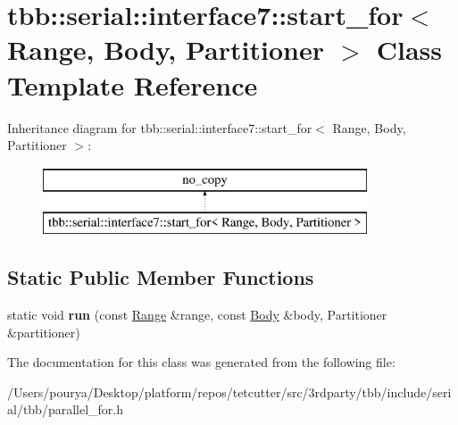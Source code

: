 \hypertarget{classtbb_1_1serial_1_1interface7_1_1start__for}{}\section{tbb\+:\+:serial\+:\+:interface7\+:\+:start\+\_\+for$<$ Range, Body, Partitioner $>$ Class Template Reference}
\label{classtbb_1_1serial_1_1interface7_1_1start__for}
Inheritance diagram for tbb\+:\+:serial\+:\+:interface7\+:\+:start\+\_\+for$<$ Range, Body, Partitioner $>$\+:\begin{figure}[H]
\begin{center}
\leavevmode
\includegraphics[height=2.000000cm]{classtbb_1_1serial_1_1interface7_1_1start__for}
\end{center}
\end{figure}
\subsection*{Static Public Member Functions}
\begin{DoxyCompactItemize}
\item 
\hypertarget{classtbb_1_1serial_1_1interface7_1_1start__for_a87e577d05f4a727f74ce7a8b93a899ec}{}static void {\bfseries run} (const \hyperlink{classtbb_1_1blocked__range}{Range} \&range, const \hyperlink{classBody}{Body} \&body, Partitioner \&partitioner)\label{classtbb_1_1serial_1_1interface7_1_1start__for_a87e577d05f4a727f74ce7a8b93a899ec}

\end{DoxyCompactItemize}


The documentation for this class was generated from the following file\+:\begin{DoxyCompactItemize}
\item 
/\+Users/pourya/\+Desktop/platform/repos/tetcutter/src/3rdparty/tbb/include/serial/tbb/parallel\+\_\+for.\+h\end{DoxyCompactItemize}
